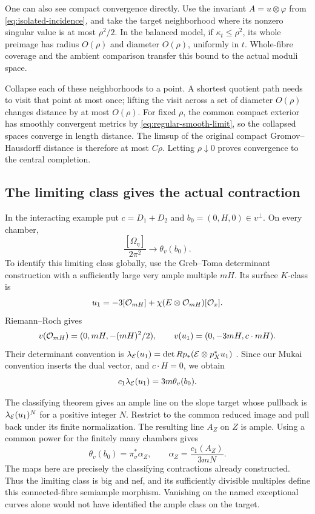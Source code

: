 One can also see compact convergence directly.
Use the invariant $A=u\otimes\varphi$ from
\eqref{eq:isolated-incidence}, and take the
target neighborhood where its nonzero singular
value is at most $\rho^2/2$. In the balanced
model, if $\kappa_t\le\rho^2$, its whole
preimage has radius $O(\rho)$ and diameter
$O(\rho)$, uniformly in $t$. Whole-fibre
coverage and the ambient comparison transfer
this bound to the actual moduli space.

Collapse each of these neighborhoods to a
point. A shortest quotient path needs to
visit that point at most once; lifting the
visit across a set of diameter $O(\rho)$
changes distance by at most $O(\rho)$.
For fixed $\rho$, the common compact exterior
has smoothly convergent metrics by
\eqref{eq:regular-smooth-limit}, so the
collapsed spaces converge in length distance.
The limsup of the original compact
Gromov--Hausdorff distance is therefore at
most $C\rho$. Letting $\rho\downarrow0$
proves convergence to the central completion.

\subsection{The limiting class gives the actual contraction}
In the interacting example put $c=D_1+D_2$
and $b_0=(0,H,0)\in v^\perp$. On every
chamber,
\[
 \frac{[\Omega_\eta]}{2\pi^2}
       \longrightarrow\theta_v(b_0).
\]
To identify this limiting class globally, use
the Greb--Toma determinant construction with
a sufficiently large very ample multiple $mH$.
Its surface $K$-class is
\[
 u_1=-3[\mathcal O_{mH}]
       +\chi(E\otimes\mathcal O_{mH})[\mathcal O_x].
\]
Riemann--Roch gives
\[
 v(\mathcal O_{mH})=(0,mH,-(mH)^2/2),\qquad
 v(u_1)=(0,-3mH,c\cdot mH).
\]
Their determinant convention is
$\lambda_{\mathcal E}(u_1)=\det Rp_*(\mathcal E\otimes p_X^*u_1)$
\cite[Definition~2.1]{grebtoma}. Since our
Mukai convention inserts the dual vector,
and $c\cdot H=0$, we obtain
\begin{equation}\label{eq:determinant-polarization}
 c_1\lambda_{\mathcal E}(u_1)=3m\theta_v(b_0).
\end{equation}

The classifying theorem gives an ample line
on the slope target whose pullback is
$\lambda_{\mathcal E}(u_1)^N$ for a positive integer
$N$. Restrict to the common reduced image
and pull back under its finite normalization.
The resulting line $A_Z$ on $Z$ is ample.
Using a common power for the finitely many
chambers gives
\begin{equation}\label{eq:common-ample-class}
 \theta_v(b_0)=\pi_\sigma^*\alpha_Z,
 \qquad \alpha_Z=\frac{c_1(A_Z)}{3mN}.
\end{equation}
The maps here are precisely the classifying
contractions already constructed. Thus the
limiting class is big and nef, and its
sufficiently divisible multiples define
this connected-fibre semiample morphism.
Vanishing on the named exceptional curves
alone would not have identified the ample
class on the target.

